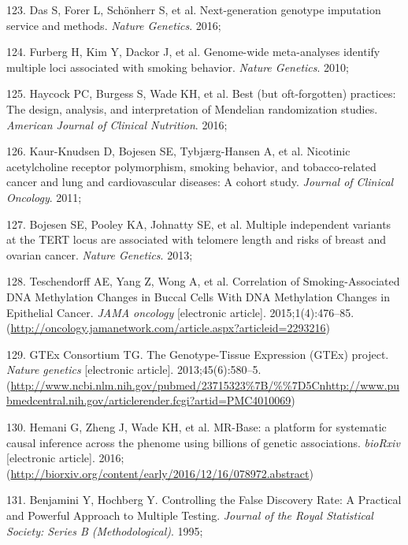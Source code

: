 \documentclass[11pt,twoside]{bristolthesis}
\newenvironment{cslreferences}%
  {}%
  {\par}
\begin{document}
\begin{cslreferences}
\leavevmode\hypertarget{ref-Das2016}{}%
123. Das S, Forer L, Schönherr S, et al. Next-generation genotype imputation service and methods. \emph{Nature Genetics}. 2016;

\leavevmode\hypertarget{ref-Furberg2010}{}%
124. Furberg H, Kim Y, Dackor J, et al. Genome-wide meta-analyses identify multiple loci associated with smoking behavior. \emph{Nature Genetics}. 2010;

\leavevmode\hypertarget{ref-Haycock2016}{}%
125. Haycock PC, Burgess S, Wade KH, et al. Best (but oft-forgotten) practices: The design, analysis, and interpretation of Mendelian randomization studies. \emph{American Journal of Clinical Nutrition}. 2016;

\leavevmode\hypertarget{ref-Kaur-Knudsen2011}{}%
126. Kaur-Knudsen D, Bojesen SE, Tybjærg-Hansen A, et al. Nicotinic acetylcholine receptor polymorphism, smoking behavior, and tobacco-related cancer and lung and cardiovascular diseases: A cohort study. \emph{Journal of Clinical Oncology}. 2011;

\leavevmode\hypertarget{ref-Bojesen2013}{}%
127. Bojesen SE, Pooley KA, Johnatty SE, et al. Multiple independent variants at the TERT locus are associated with telomere length and risks of breast and ovarian cancer. \emph{Nature Genetics}. 2013;

\leavevmode\hypertarget{ref-Teschendorff2015}{}%
128. Teschendorff AE, Yang Z, Wong A, et al. Correlation of Smoking-Associated DNA Methylation Changes in Buccal Cells With DNA Methylation Changes in Epithelial Cancer. \emph{JAMA oncology} {[}electronic article{]}. 2015;1(4):476--85. (\url{http://oncology.jamanetwork.com/article.aspx?articleid=2293216})

\leavevmode\hypertarget{ref-GTExConsortium2013}{}%
129. GTEx Consortium TG. The Genotype-Tissue Expression (GTEx) project. \emph{Nature genetics} {[}electronic article{]}. 2013;45(6):580--5. (\url{http://www.ncbi.nlm.nih.gov/pubmed/23715323\%7B/\%\%7D5Cnhttp://www.pubmedcentral.nih.gov/articlerender.fcgi?artid=PMC4010069})

\leavevmode\hypertarget{ref-Hemani2016}{}%
130. Hemani G, Zheng J, Wade KH, et al. MR-Base: a platform for systematic causal inference across the phenome using billions of genetic associations. \emph{bioRxiv} {[}electronic article{]}. 2016;(\url{http://biorxiv.org/content/early/2016/12/16/078972.abstract})

\leavevmode\hypertarget{ref-Benjamini1995}{}%
131. Benjamini Y, Hochberg Y. Controlling the False Discovery Rate: A Practical and Powerful Approach to Multiple Testing. \emph{Journal of the Royal Statistical Society: Series B (Methodological)}. 1995;


\end{cslreferences}
\end{document}
